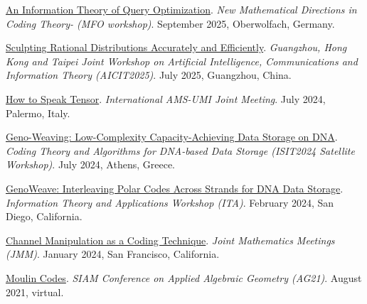 \documentclass{article}
\def\sec#1{\vskip1em\textbf{\fs1#1}}
\def\fs#1{%
        \pgfmathsetmacro\a{#1}%
        \pgfmathsetmacro\A{\parskip*(4/3)^\a}%
        \pgfmathsetmacro\B{\A*(4/3)}%
        \fontsize{\A pt}{\B pt}\selectfont%
    }
\begin{document}
\bgroup
\def\section#1#2{\sec{Invited Talks \mdseries (new to old)}}
\begin{thebibliography}{T9}

    \href{https://www.mfo.de/www/activity/2537}
    {An Information Theory of Query Optimization}.
    \emph{New Mathematical Directions in Coding Theory- (MFO workshop)}.
    September 2025, Oberwolfach, Germany.

    \href{https://aicit2025.github.io/Program/}
    {Sculpting Rational Distributions Accurately and Efficiently}.
    \emph{Guangzhou, Hong Kong and Taipei Joint Workshop on Artificial Intelligence, Communications and Information Theory (AICIT2025)}.
    July 2025, Guangzhou, China.

    \href{(https://umi.dm.unibo.it/jm-umi-ams/special-sessions/special-sessions-on-25-26-july-2024/)}
    {How to Speak Tensor}.
    \emph{International AMS-UMI Joint Meeting}.
    July 2024, Palermo, Italy.

    \href{https://www.ce.cit.tum.de/en/lnt/events/2024-coding-theory-and-algorithms-for-dna-based-data-storage/program/}
    {Geno-Weaving: Low-Complexity Capacity-Achieving Data Storage on DNA}.
    \emph{Coding Theory and Algorithms for DNA-based Data Storage (ISIT2024 Satellite Workshop)}.
    July 2024, Athens, Greece.

    \href{https://ita.ucsd.edu/workshop/schedule}
    {GenoWeave: Interleaving Polar Codes Across Strands for DNA Data Storage}.
    \emph{Information Theory and Applications Workshop (ITA)}.
    February 2024, San Diego, California.

    \href{https://meetings.ams.org/math/jmm2024/meetingapp.cgi/Paper/29146}
    {Channel Manipulation as a Coding Technique}.
    \emph{Joint Mathematics Meetings (JMM)}.
    January 2024, San Francisco, California.

    \href{https://meetings.siam.org/sess/dsp_programsess.cfm?SESSIONCODE=72368}
    {Moulin Codes}.
    \emph{SIAM Conference on Applied Algebraic Geometry (AG21)}.
    August 2021, virtual.
\end{thebibliography}
\egroup
\end{document}

